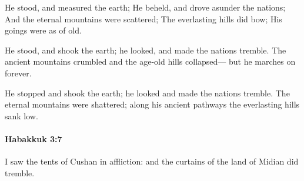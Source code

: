 			\begin{versebox}
					\item[BHS] 
					\item[LXX] 
					\item[ASV] He stood, and measured the earth; He beheld, and drove asunder the nations; And the eternal mountains were scattered; The everlasting hills did bow; His goings were as of old.
					\item[NIV] He stood, and shook the earth; he looked, and made the nations tremble. The ancient mountains crumbled and the age-old hills collapsed— but he marches on forever.
					\item[NRSV] He stopped and shook the earth; he looked and made the nations tremble. The eternal mountains were shattered; along his ancient pathways the everlasting hills sank low.
			\end{versebox}

		\paragraph{Habakkuk 3:7} %
			\label{HABAKKUK-3-7}

			I saw the tents of Cushan in affliction: and the curtains of the land of Midian did tremble.

